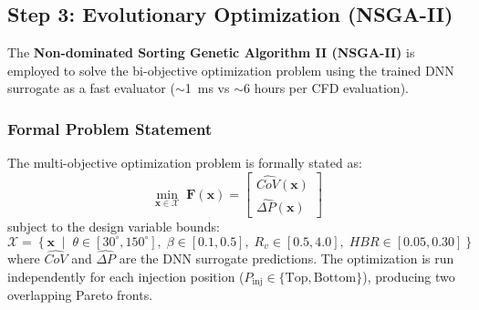 \documentclass[12pt, a4paper]{report}
\begin{document}
\subsection{Step 3: Evolutionary Optimization (NSGA-II)}
The \textbf{Non-dominated Sorting Genetic Algorithm II (NSGA-II)} is employed to solve the bi-objective optimization problem using the trained DNN surrogate as a fast evaluator ($\sim$1~ms vs $\sim$6 hours per CFD evaluation).

\subsubsection{Formal Problem Statement}
The multi-objective optimization problem is formally stated as:
\begin{equation}
    \min_{\mathbf{x} \in \mathcal{X}} \; \mathbf{F}(\mathbf{x}) = \begin{bmatrix} \widehat{CoV}(\mathbf{x}) \\ \widehat{\Delta P}(\mathbf{x}) \end{bmatrix}
    \label{eq:moo}
\end{equation}
subject to the design variable bounds:
\begin{equation}
    \mathcal{X} = \left\{ \mathbf{x} \;\middle|\; \theta \in [30^\circ, 150^\circ],\; \beta \in [0.1, 0.5],\; R_v \in [0.5, 4.0],\; HBR \in [0.05, 0.30] \right\}
\end{equation}
\noindent where $\widehat{CoV}$ and $\widehat{\Delta P}$ are the DNN surrogate predictions. The optimization is run independently for each injection position ($P_{\text{inj}} \in \{\text{Top}, \text{Bottom}\}$), producing two overlapping Pareto fronts.
\end{document}
